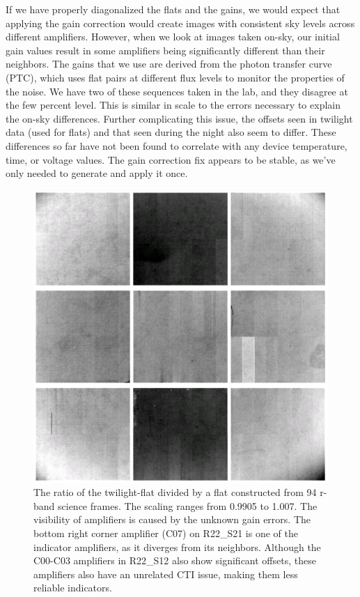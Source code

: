 If we have properly diagonalized the flats and the gains, we would expect that applying the gain correction would create images with consistent sky levels across different amplifiers.
However, when we look at images taken on-sky, our initial gain values result in some amplifiers being significantly different than their neighbors.
The gains that we use are derived from the photon transfer curve (PTC), which uses flat pairs at different flux levels to monitor the properties of the noise.
We have two of these sequences taken in the lab, and they disagree at the few percent level.
This is similar in scale to the errors necessary to explain the on-sky differences.
Further complicating this issue, the offsets seen in twilight data (used for flats) and that seen during the night also seem to differ.
These differences so far have not been found to correlate with any device temperature, time, or voltage values.
The gain correction fix appears to be stable, as we've only needed to generate and apply it once.

\begin{figure}
  \includegraphics{figures/isr-f06-twilight_flat_ratio.png}
  \caption{The ratio of the twilight-flat divided by a flat constructed from 94 r-band science frames.  The scaling ranges from 0.9905 to 1.007.  The visibility of amplifiers is caused by the unknown gain errors.  The bottom right corner amplifier (C07) on R22\_S21 is one of the indicator amplifiers, as it diverges from its neighbors.  Although the C00-C03 amplifiers in R22\_S12 also show significant offsets, these amplifiers also have an unrelated CTI issue, making them less reliable indicators.}
\end{figure}

